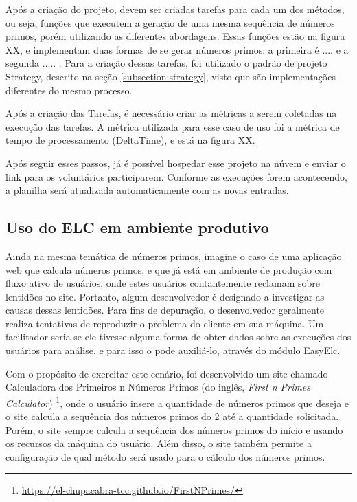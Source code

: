 \documentclass[12pt]{tcc}
\begin{document}
Após a criação do projeto, devem ser criadas tarefas para cada um dos métodos, ou seja, funções que executem a geração de uma mesma sequência de números primos, porém utilizando as diferentes abordagens. Essas funções estão na figura XX, e implementam duas formas de se gerar números primos: a primeira é ....  e a segunda ..... . Para a criação dessas tarefas, foi utilizado o padrão de projeto Strategy, descrito na seção \ref{subsection:strategy}, visto que são implementações diferentes do mesmo processo.

Após a criação das Tarefas, é necessário criar as métricas a serem coletadas na execução das tarefas. A métrica utilizada para esse caso de uso foi a métrica de tempo de processamento (DeltaTime), e está na figura XX.

Após seguir esses passos, já é possível hospedar esse projeto na núvem e enviar o link para os voluntários participarem. Conforme as execuções forem acontecendo, a planilha será atualizada automaticamente com as novas entradas.


\subsection{Uso do ELC em ambiente produtivo}
\label{subsection:exemplo-elc-prod}

Ainda na mesma temática de números primos, imagine o caso de uma aplicação web que calcula números primos, e que já está em ambiente de produção com fluxo ativo de usuários, onde estes usuários contantemente reclamam sobre lentidões no site. Portanto, algum desenvolvedor é designado a investigar as causas dessas lentidões. Para fins de depuração, o desenvolvedor geralmente realiza tentativas de reproduzir o problema do cliente em sua máquina. Um facilitador seria se ele tivesse alguma forma de obter dados sobre as execuções dos usuários para análise, e para isso o  pode auxiliá-lo, através do módulo EasyElc.


Com o propósito de exercitar este cenário, foi desenvolvido um site chamado Calculadora dos Primeiros n Números Primos (do inglês, \emph{First n Primes Calculator})
\footnote{\url{https://el-chupacabra-tcc.github.io/FirstNPrimes/}}, onde o usuário insere a quantidade de números primos que deseja e o site calcula a sequência dos números primos do 2 até a quantidade solicitada.
Porém, o site sempre calcula a sequência dos números primos do início e usando os recursos da máquina do usuário.
Além disso, o site também permite a configuração de qual método será usado para o cálculo dos números primos.
\end{document}
